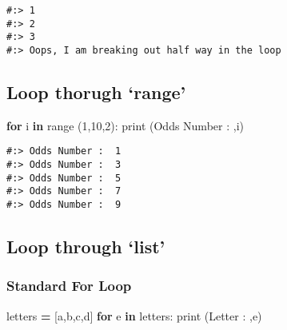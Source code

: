 \documentclass[
]{book}
\newenvironment{Shaded}{\begin{snugshade}}{\end{snugshade}}
\newcommand{\BuiltInTok}[1]{#1}
\newcommand{\ControlFlowTok}[1]{\textcolor[rgb]{0.27,0.27,0.27}{\textbf{#1}}}
\newcommand{\DecValTok}[1]{\textcolor[rgb]{0.06,0.06,0.06}{#1}}
\newcommand{\KeywordTok}[1]{\textcolor[rgb]{0.27,0.27,0.27}{\textbf{#1}}}
\newcommand{\NormalTok}[1]{#1}
\newcommand{\OperatorTok}[1]{\textcolor[rgb]{0.43,0.43,0.43}{\textbf{#1}}}
\newcommand{\StringTok}[1]{\textcolor[rgb]{0.5,0.5,0.5}{#1}}
\begin{document}
\begin{verbatim}
#:> 1
#:> 2
#:> 3
#:> Oops, I am breaking out half way in the loop
\end{verbatim}

\hypertarget{loop-thorugh-range}{%
\subsection{Loop thorugh `range'}\label{loop-thorugh-range}}

\begin{Shaded}
\begin{Highlighting}[]
\ControlFlowTok{for}\NormalTok{ i }\KeywordTok{in} \BuiltInTok{range}\NormalTok{ (}\DecValTok{1}\NormalTok{,}\DecValTok{10}\NormalTok{,}\DecValTok{2}\NormalTok{):}
    \BuiltInTok{print}\NormalTok{ (}\StringTok{\textquotesingle{}Odds Number : \textquotesingle{}}\NormalTok{,i) }
\end{Highlighting}
\end{Shaded}

\begin{verbatim}
#:> Odds Number :  1
#:> Odds Number :  3
#:> Odds Number :  5
#:> Odds Number :  7
#:> Odds Number :  9
\end{verbatim}

\hypertarget{loop-through-list}{%
\subsection{Loop through `list'}\label{loop-through-list}}

\hypertarget{standard-for-loop}{%
\subsubsection{Standard For Loop}\label{standard-for-loop}}

\begin{Shaded}
\begin{Highlighting}[]
\NormalTok{letters }\OperatorTok{=}\NormalTok{ [}\StringTok{\textquotesingle{}a\textquotesingle{}}\NormalTok{,}\StringTok{\textquotesingle{}b\textquotesingle{}}\NormalTok{,}\StringTok{\textquotesingle{}c\textquotesingle{}}\NormalTok{,}\StringTok{\textquotesingle{}d\textquotesingle{}}\NormalTok{]}
\ControlFlowTok{for}\NormalTok{ e }\KeywordTok{in}\NormalTok{ letters:}
    \BuiltInTok{print}\NormalTok{ (}\StringTok{\textquotesingle{}Letter : \textquotesingle{}}\NormalTok{,e)}
\end{Highlighting}
\end{Shaded}
\end{document}
